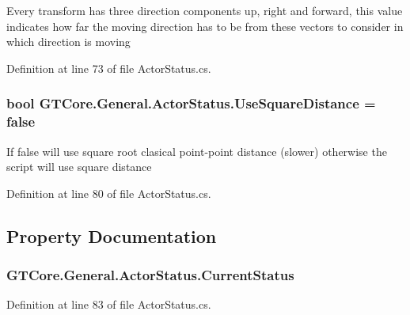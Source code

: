 Every transform has three direction components up, right and forward, this value indicates how far the moving direction has to be from these vectors to consider in which direction is moving 



Definition at line 73 of file Actor\+Status.\+cs.

\hypertarget{class_g_t_core_1_1_general_1_1_actor_status_a0d0cbeef5571a70649af514bf4278069}{}
\subsubsection[{Use\+Square\+Distance}]{\setlength{\rightskip}{0pt plus 5cm}bool G\+T\+Core.\+General.\+Actor\+Status.\+Use\+Square\+Distance = false}\label{class_g_t_core_1_1_general_1_1_actor_status_a0d0cbeef5571a70649af514bf4278069}


If false will use square root clasical point-\/point distance (slower) otherwise the script will use square distance 



Definition at line 80 of file Actor\+Status.\+cs.



\subsection{Property Documentation}
\hypertarget{class_g_t_core_1_1_general_1_1_actor_status_a9181dd383318ffc47c661a22f1ce3ca2}{}
\subsubsection[{Current\+Status}]{ G\+T\+Core.\+General.\+Actor\+Status.\+Current\+Status\hspace{0.3cm}{\ttfamily [get]}}\label{class_g_t_core_1_1_general_1_1_actor_status_a9181dd383318ffc47c661a22f1ce3ca2}


Definition at line 83 of file Actor\+Status.\+cs.

